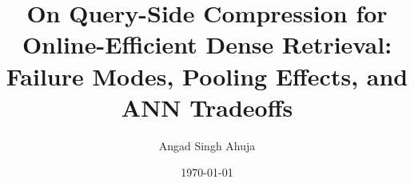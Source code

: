\documentclass[10pt,twocolumn]{article}
\title{On Query-Side Compression for Online-Efficient Dense Retrieval:\\Failure Modes, Pooling Effects, and ANN Tradeoffs}
\author{Angad Singh Ahuja}
\date{\today}
\begin{document}
\raggedbottom
\maketitle













\end{document}
